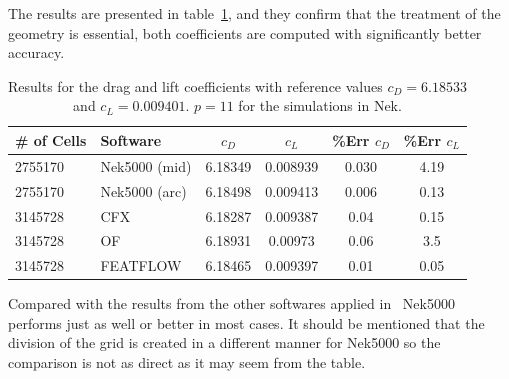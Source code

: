 The results are presented in table~\ref{tab:testcase}, and they confirm that the treatment of the geometry is 
essential, both coefficients are computed with significantly better accuracy. 
%
\begin{table}
\centering
\begin{tabular}{l l c c c c}
		\toprule
		\# of Cells & Software & $c_D$ & $c_L$ & \%\textbf{Err} $c_D$ &\%\textbf{Err} $c_L$ \\ \midrule 
		2755170& Nek5000 (mid) & 6.18349 & 0.008939 & 0.030 & 4.19 \\ 
		2755170& Nek5000 (arc) & 6.18498 & 0.009413 & 0.006 & 0.13 \\
		3145728 & CFX 		 & 6.18287 & 0.009387 & 0.04 &0.15 \\
		3145728 & OF	     & 6.18931 & 0.00973 & 0.06 &3.5 \\
		3145728 & FEATFLOW   & 6.18465 & 0.009397 & 0.01 &0.05 \\
		\bottomrule	
	\end{tabular}
	\caption{Results for the drag and lift coefficients with reference values 
	$c_D = 6.18533$ and $c_L = 0.009401$. $p=11$ for the simulations in Nek.}
\label{tab:testcase}
\end{table}
%
Compared with the results from the other softwares applied in~\cite{benchmark} Nek5000 performs 
just as well or better in most cases. It should be mentioned that the division of the grid is created
in a different manner for Nek5000 so the comparison is not as direct as it may seem from the table.

